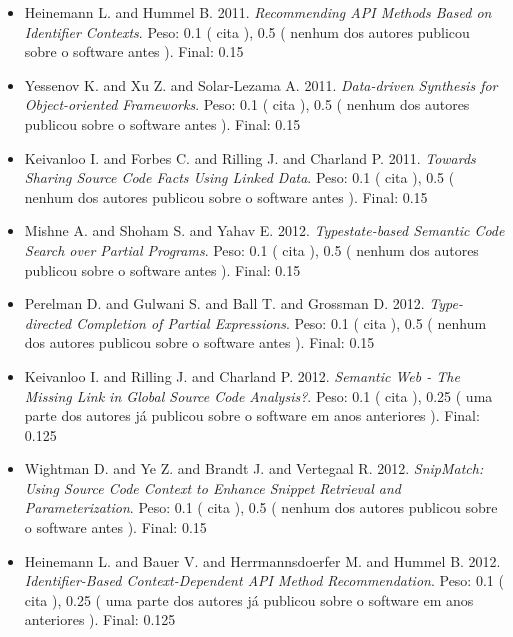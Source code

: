 \begin{itemize}
\item Heinemann L. and Hummel B.
      2011.
        \textit{ Recommending API Methods Based on Identifier Contexts}.
      Peso:
      0.1 (
          cita
      ),
      0.5 (
nenhum dos autores publicou sobre o software antes
      ).
      Final:
      0.15

\item Yessenov K. and Xu Z. and Solar-Lezama A.
      2011.
        \textit{ Data-driven Synthesis for Object-oriented Frameworks}.
      Peso:
      0.1 (
          cita
      ),
      0.5 (
nenhum dos autores publicou sobre o software antes
      ).
      Final:
      0.15

\item Keivanloo I. and Forbes C. and Rilling J. and Charland P.
      2011.
        \textit{ Towards Sharing Source Code Facts Using Linked Data}.
      Peso:
      0.1 (
          cita
      ),
      0.5 (
nenhum dos autores publicou sobre o software antes
      ).
      Final:
      0.15

\item Mishne A. and Shoham S. and Yahav E.
      2012.
        \textit{ Typestate-based Semantic Code Search over Partial Programs}.
      Peso:
      0.1 (
          cita
      ),
      0.5 (
nenhum dos autores publicou sobre o software antes
      ).
      Final:
      0.15

\item Perelman D. and Gulwani S. and Ball T. and Grossman D.
      2012.
        \textit{ Type-directed Completion of Partial Expressions}.
      Peso:
      0.1 (
          cita
      ),
      0.5 (
nenhum dos autores publicou sobre o software antes
      ).
      Final:
      0.15

\item Keivanloo I. and Rilling J. and Charland P.
      2012.
        \textit{ Semantic Web - The Missing Link in Global Source Code Analysis?}.
      Peso:
      0.1 (
          cita
      ),
      0.25 (
uma parte dos autores já publicou sobre o software em anos anteriores
      ).
      Final:
      0.125

\item Wightman D. and Ye Z. and Brandt J. and Vertegaal R.
      2012.
        \textit{ SnipMatch: Using Source Code Context to Enhance Snippet Retrieval and Parameterization}.
      Peso:
      0.1 (
          cita
      ),
      0.5 (
nenhum dos autores publicou sobre o software antes
      ).
      Final:
      0.15

\item Heinemann L. and Bauer V. and Herrmannsdoerfer M. and Hummel B.
      2012.
        \textit{ Identifier-Based Context-Dependent API Method Recommendation}.
      Peso:
      0.1 (
          cita
      ),
      0.25 (
uma parte dos autores já publicou sobre o software em anos anteriores
      ).
      Final:
      0.125


\end{itemize}
